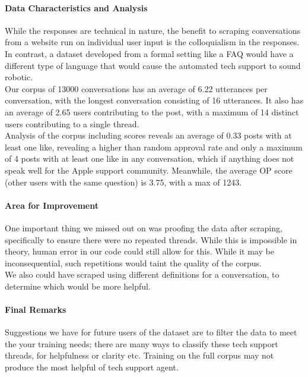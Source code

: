 \documentclass[10pt]{article}
\begin{document}
\begin{multicols}{2}
\paragraph{Data Characteristics and Analysis}
While the responses are technical in nature, the benefit to scraping conversations from a website run on individual user input is the colloquialism in the responses. In contrast, a dataset developed from a formal setting like a FAQ would have a different type of language that would cause the automated tech support to sound robotic.\\

Our corpus of 13000 conversations has an average of 6.22 utterances per conversation, with the longest conversation consisting of 16 utterances. It also has an average of 2.65 users contributing to the post, with a maximum of 14 distinct users contributing to a single thread.\\

Analysis of the corpus including scores reveals an average of 0.33 posts with at least one like, revealing a higher than random approval rate and only a maximum of 4 posts with at least one like in any conversation, which if anything does not speak well for the Apple support community. Meanwhile, the average OP score (other users with the same question) is 3.75, with a max of 1243.

\paragraph{Area for Improvement}
One important thing we missed out on was proofing the data after scraping, specifically to ensure there were no repeated threads. While this is impossible in theory, human error in our code could still allow for this. While it may be inconsequential, such repetitions would taint the quality of the corpus.\\

We also could have scraped using different definitions for a conversation, to determine which would be more helpful.

\paragraph{Final Remarks}
Suggestions we have for future users of the dataset are to filter the data to meet the your training needs; there are many ways to classify these tech support threads, for helpfulness or clarity etc. Training on the full corpus may not produce the most helpful of tech support agent.



\end{multicols}
\end{document}
